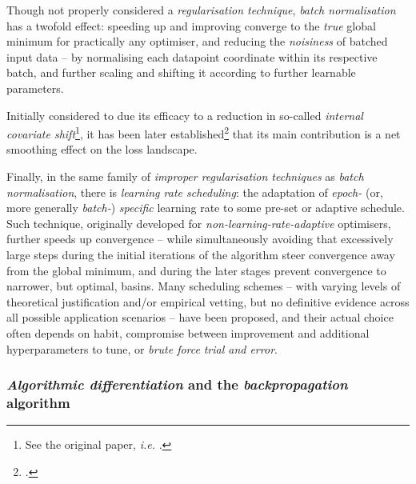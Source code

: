 Though not properly considered a \textit{regularisation technique}, \textit{batch normalisation} has a twofold effect: speeding up and improving converge to the \textit{true} global minimum for practically any optimiser, and reducing the \textit{noisiness} of batched input data -- by normalising each datapoint coordinate within its respective batch, and further scaling and shifting it according to further learnable parameters.

Initially considered to due its efficacy to a reduction in so-called \textit{internal covariate shift}\footnote{See the original paper, \textit{i.e.} \cite{IoffeSzegedy2015BatchNorm}.}, it has been later established\footnote{\cite{SanturkarEtAl2018BatchNorm}.} that its main contribution is a net smoothing effect on the loss landscape.

Finally, in the same family of \textit{improper regularisation techniques} as \textit{batch normalisation}, there is \textit{learning rate scheduling}: the adaptation of \textit{epoch-} (or, more generally \textit{batch-}) \textit{specific} learning rate to some pre-set or adaptive schedule. Such technique, originally developed for \textit{non-learning-rate-adaptive} optimisers, further speeds up convergence -- while simultaneously avoiding that excessively large steps during the initial iterations of the algorithm steer convergence away from the global minimum, and during the later stages prevent convergence to narrower, but optimal, basins. Many scheduling schemes -- with varying levels of theoretical justification and/or empirical vetting, but no definitive evidence across all possible application scenarios -- have been proposed, and their actual choice often depends on habit, compromise between improvement and additional hyperparameters to tune, or \textit{brute force} \textit{trial and error}.

\subsubsection{\textit{Algorithmic differentiation} and the \textit{backpropagation} algorithm}

